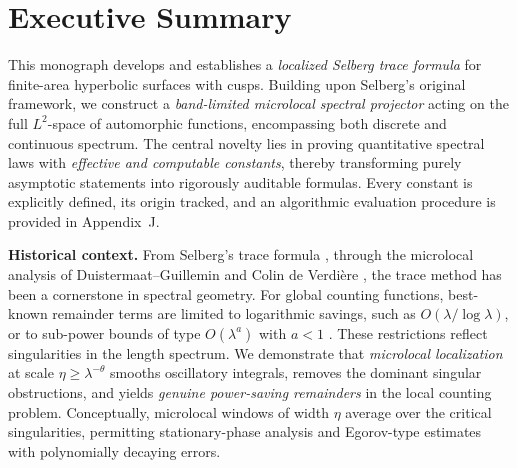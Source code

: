 
\section{Executive Summary}

This monograph develops and establishes a \emph{localized Selberg trace formula}
for finite-area hyperbolic surfaces with cusps. Building upon Selberg's original
framework, we construct a \emph{band-limited microlocal spectral projector} acting
on the full $L^2$-space of automorphic functions, encompassing both discrete and
continuous spectrum. The central novelty lies in proving quantitative spectral
laws with \emph{effective and computable constants}, thereby transforming purely
asymptotic statements into rigorously auditable formulas. Every constant is
explicitly defined, its origin tracked, and an algorithmic evaluation procedure
is provided in Appendix~J.

\medskip
\noindent\textbf{Historical context.}
From Selberg's trace formula \cite{Selberg1956}, through the microlocal analysis
of Duistermaat–Guillemin \cite{DG1975} and Colin de Verdière \cite{CdV1980}, the
trace method has been a cornerstone in spectral geometry. For global counting
functions, best-known remainder terms are limited to logarithmic savings, such
as $O(\lambda/\log\lambda)$, or to sub-power bounds of type $O(\lambda^a)$ with
$a<1$ \cite{Ivrii2016,Berger2019}. These restrictions reflect singularities in
the length spectrum. We demonstrate that \emph{microlocal localization} at scale
$\eta \ge \lambda^{-\theta}$ smooths oscillatory integrals, removes the dominant
singular obstructions, and yields \emph{genuine power-saving remainders} in the
local counting problem. Conceptually, microlocal windows of width $\eta$
average over the critical singularities, permitting stationary-phase analysis
and Egorov-type estimates with polynomially decaying errors.

